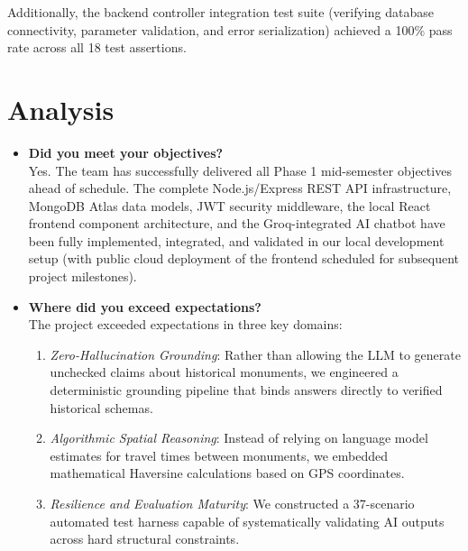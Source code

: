 \documentclass[12pt,a4paper,twoside,openright]{report}
\begin{document}
Additionally, the backend controller integration test suite (verifying database connectivity, parameter validation, and error serialization) achieved a 100\% pass rate across all 18 test assertions.

\section{Analysis}

\begin{itemize}[leftmargin=*]
    \item \textbf{Did you meet your objectives?}\\
    Yes. The team has successfully delivered all Phase 1 mid-semester objectives ahead of schedule. The complete Node.js/Express REST API infrastructure, MongoDB Atlas data models, JWT security middleware, the local React frontend component architecture, and the Groq-integrated AI chatbot have been fully implemented, integrated, and validated in our local development setup (with public cloud deployment of the frontend scheduled for subsequent project milestones).

    \item \textbf{Where did you exceed expectations?}\\
    The project exceeded expectations in three key domains:
    \begin{enumerate}
        \item \textit{Zero-Hallucination Grounding}: Rather than allowing the LLM to generate unchecked claims about historical monuments, we engineered a deterministic grounding pipeline that binds answers directly to verified historical schemas.
        \item \textit{Algorithmic Spatial Reasoning}: Instead of relying on language model estimates for travel times between monuments, we embedded mathematical Haversine calculations based on GPS coordinates.
        \item \textit{Resilience and Evaluation Maturity}: We constructed a 37-scenario automated test harness capable of systematically validating AI outputs across hard structural constraints.
    \end{enumerate}


\end{itemize}
\end{document}
